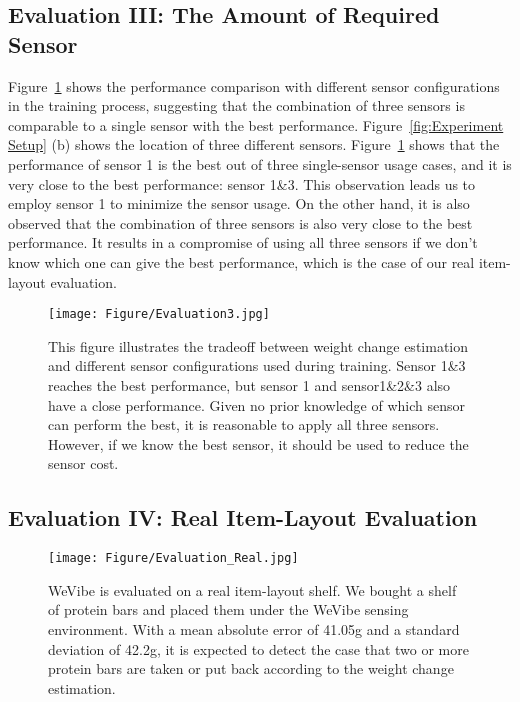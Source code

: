 \subsection{Evaluation III: The Amount of Required Sensor}
\label{eval:sensor}
Figure~\ref{fig:Evaluation3} shows the performance comparison with different sensor configurations in the training process, suggesting that the combination of three sensors is comparable to a single sensor with the best performance. Figure~\ref{fig:Experiment Setup} (b) shows the location of three different sensors. Figure~\ref{fig:Evaluation3} shows that the performance of sensor 1 is the best out of three single-sensor usage cases, and it is very close to the best performance: sensor 1\&3. This observation leads us to employ sensor 1 to minimize the sensor usage. On the other hand, it is also observed that the combination of three sensors is also very close to the best performance. It results in a compromise of using all three sensors if we don't know which one can give the best performance, which is the case of our real item-layout evaluation.

\begin{figure}[t]
    \centering
    \texttt{[image: Figure/Evaluation3.jpg]}
    \caption{This figure illustrates the tradeoff between weight change estimation and different sensor configurations used during training. Sensor 1\&3 reaches the best performance, but sensor 1 and sensor1\&2\&3 also have a close performance. Given no prior knowledge of which sensor can perform the best, it is reasonable to apply all three sensors. However, if we know the best sensor, it should be used to reduce the sensor cost.}
    \label{fig:Evaluation3}
\end{figure}

\subsection{Evaluation IV: Real Item-Layout Evaluation}

\begin{figure}[tbh]
    \centering
    \texttt{[image: Figure/Evaluation\_Real.jpg]}
    \caption{WeVibe is evaluated on a real item-layout shelf. We bought a shelf of protein bars and placed them under the WeVibe sensing environment. With a mean absolute error of 41.05g and a standard deviation of 42.2g, it is expected to detect the case that two or more protein bars are taken or put back according to the weight change estimation.}
    \label{fig:Evaluation Real}
\end{figure}

